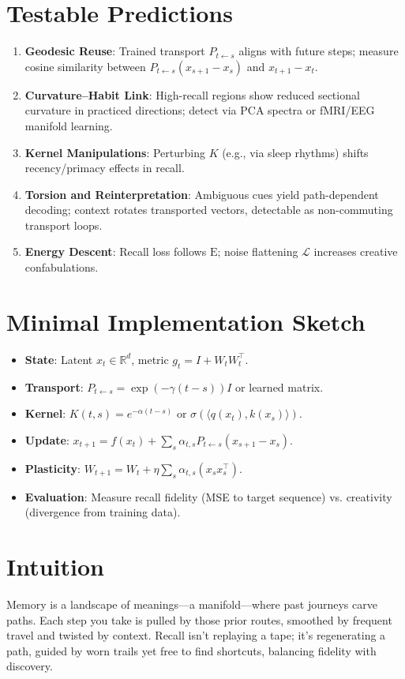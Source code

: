 \documentclass[a4paper,12pt]{article}
\newcommand{\E}{\mathrm{E}}
\begin{document}
\section{Testable Predictions}
\begin{enumerate}
    \item \textbf{Geodesic Reuse}: Trained transport $P_{t \leftarrow s}$ aligns with future steps; measure cosine similarity between $P_{t \leftarrow s} (x_{s+1} - x_s)$ and $x_{t+1} - x_t$.
    \item \textbf{Curvature–Habit Link}: High-recall regions show reduced sectional curvature in practiced directions; detect via PCA spectra or fMRI/EEG manifold learning.
    \item \textbf{Kernel Manipulations}: Perturbing $K$ (e.g., via sleep rhythms) shifts recency/primacy effects in recall.
    \item \textbf{Torsion and Reinterpretation}: Ambiguous cues yield path-dependent decoding; context rotates transported vectors, detectable as non-commuting transport loops.
    \item \textbf{Energy Descent}: Recall loss follows $\E$; noise flattening $\mathcal{L}$ increases creative confabulations.
\end{enumerate}

\section{Minimal Implementation Sketch}
\begin{itemize}
    \item \textbf{State}: Latent $x_t \in \mathbb{R}^d$, metric $g_t = I + W_t W_t^\top$.
    \item \textbf{Transport}: $P_{t \leftarrow s} = \exp(-\gamma (t-s)) I$ or learned matrix.
    \item \textbf{Kernel}: $K(t,s) = e^{-\alpha (t-s)}$ or $\sigma(\langle q(x_t), k(x_s) \rangle)$.
    \item \textbf{Update}: $x_{t+1} = f(x_t) + \sum_s \alpha_{t,s} P_{t \leftarrow s} (x_{s+1} - x_s)$.
    \item \textbf{Plasticity}: $W_{t+1} = W_t + \eta \sum_s \alpha_{t,s} (x_s x_s^\top)$.
    \item \textbf{Evaluation}: Measure recall fidelity (MSE to target sequence) vs. creativity (divergence from training data).
\end{itemize}

\section{Intuition}
Memory is a landscape of meanings—a manifold—where past journeys carve paths. Each step you take is pulled by those prior routes, smoothed by frequent travel and twisted by context. Recall isn’t replaying a tape; it’s regenerating a path, guided by worn trails yet free to find shortcuts, balancing fidelity with discovery.



\end{document}

